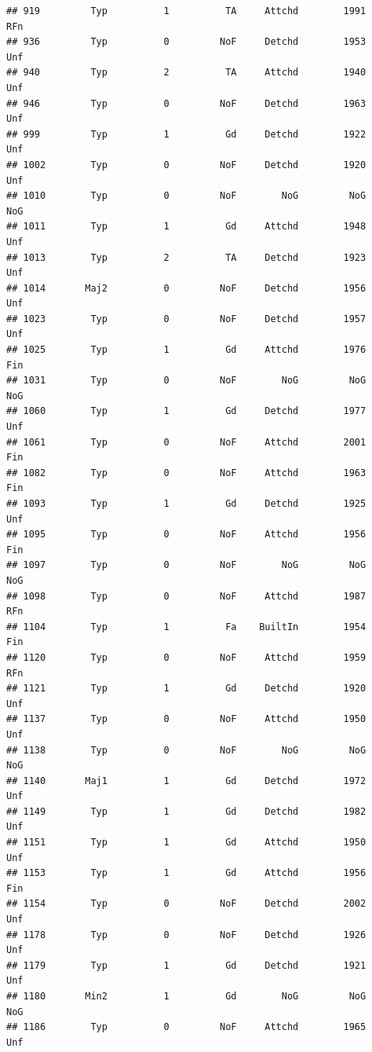 \documentclass[]{article}
\begin{document}
\begin{verbatim}
## 919         Typ          1          TA     Attchd        1991          RFn
## 936         Typ          0         NoF     Detchd        1953          Unf
## 940         Typ          2          TA     Attchd        1940          Unf
## 946         Typ          0         NoF     Detchd        1963          Unf
## 999         Typ          1          Gd     Detchd        1922          Unf
## 1002        Typ          0         NoF     Detchd        1920          Unf
## 1010        Typ          0         NoF        NoG         NoG          NoG
## 1011        Typ          1          Gd     Attchd        1948          Unf
## 1013        Typ          2          TA     Detchd        1923          Unf
## 1014       Maj2          0         NoF     Detchd        1956          Unf
## 1023        Typ          0         NoF     Detchd        1957          Unf
## 1025        Typ          1          Gd     Attchd        1976          Fin
## 1031        Typ          0         NoF        NoG         NoG          NoG
## 1060        Typ          1          Gd     Detchd        1977          Unf
## 1061        Typ          0         NoF     Attchd        2001          Fin
## 1082        Typ          0         NoF     Attchd        1963          Fin
## 1093        Typ          1          Gd     Detchd        1925          Unf
## 1095        Typ          0         NoF     Attchd        1956          Fin
## 1097        Typ          0         NoF        NoG         NoG          NoG
## 1098        Typ          0         NoF     Attchd        1987          RFn
## 1104        Typ          1          Fa    BuiltIn        1954          Fin
## 1120        Typ          0         NoF     Attchd        1959          RFn
## 1121        Typ          1          Gd     Detchd        1920          Unf
## 1137        Typ          0         NoF     Attchd        1950          Unf
## 1138        Typ          0         NoF        NoG         NoG          NoG
## 1140       Maj1          1          Gd     Detchd        1972          Unf
## 1149        Typ          1          Gd     Detchd        1982          Unf
## 1151        Typ          1          Gd     Attchd        1950          Unf
## 1153        Typ          1          Gd     Attchd        1956          Fin
## 1154        Typ          0         NoF     Detchd        2002          Unf
## 1178        Typ          0         NoF     Detchd        1926          Unf
## 1179        Typ          1          Gd     Detchd        1921          Unf
## 1180       Min2          1          Gd        NoG         NoG          NoG
## 1186        Typ          0         NoF     Attchd        1965          Unf

\end{verbatim}
\end{document}
